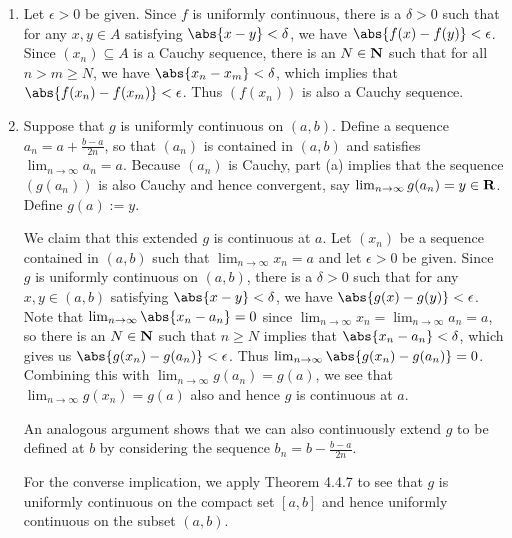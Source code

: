 \documentclass{lew98_solutions}
\begin{document}
\begin{solution}
    \begin{enumerate}
        \item Let \( \epsilon > 0 \) be given. Since \( f \) is uniformly continuous, there is a \( \delta > 0 \) such that for any \( x, y \in A \) satisfying \( \abs{x - y} < \delta \), we have \( \abs{f(x) - f(y)} < \epsilon \). Since \( (x_n) \subseteq A \) is a Cauchy sequence, there is an \( N \in \mathbf{N} \) such that for all \( n > m \geq N \), we have \( \abs{x_n - x_m} < \delta \), which implies that \( \abs{f(x_n) - f(x_m)} < \epsilon \). Thus \( (f(x_n)) \) is also a Cauchy sequence.

        \item Suppose that \( g \) is uniformly continuous on \( (a, b) \). Define a sequence \( a_n = a + \tfrac{b - a}{2n} \), so that \( (a_n) \) is contained in \( (a, b) \) and satisfies \( \lim_{n \to \infty} a_n = a \). Because \( (a_n) \) is Cauchy, part (a) implies that the sequence \( (g(a_n)) \) is also Cauchy and hence convergent, say \( \lim_{n \to \infty} g(a_n) = y \in \mathbf{R} \). Define \( g(a) := y \). 
        
        We claim that this extended \( g \) is continuous at \( a \). Let \( (x_n) \) be a sequence contained in \( (a, b) \) such that \( \lim_{n \to \infty} x_n = a \) and let \( \epsilon > 0 \) be given. Since \( g \) is uniformly continuous on \( (a, b) \), there is a \( \delta > 0 \) such that for any \( x, y \in (a, b) \) satisfying \( \abs{x - y} < \delta \), we have \( \abs{g(x) - g(y)} < \epsilon \). Note that \( \lim_{n \to \infty} \abs{x_n - a_n} = 0 \) since \( \lim_{n \to \infty} x_n = \lim_{n \to \infty} a_n = a \), so there is an \( N \in \mathbf{N} \) such that \( n \geq N \) implies that \( \abs{x_n - a_n} < \delta \), which gives us \( \abs{g(x_n) - g(a_n)} < \epsilon \). Thus \( \lim_{n \to \infty} \abs{g(x_n) - g(a_n)} = 0 \). Combining this with \( \lim_{n \to \infty} g(a_n) = g(a) \), we see that \( \lim_{n \to \infty} g(x_n) = g(a) \) also and hence \( g \) is continuous at \( a \).

        An analogous argument shows that we can also continuously extend \( g \) to be defined at \( b \) by considering the sequence \( b_n = b - \tfrac{b - a}{2n} \).

        For the converse implication, we apply Theorem 4.4.7 to see that \( g \) is uniformly continuous on the compact set \( [a, b] \) and hence uniformly continuous on the subset \( (a, b) \).
    \end{enumerate}
\end{solution}
\end{document}
